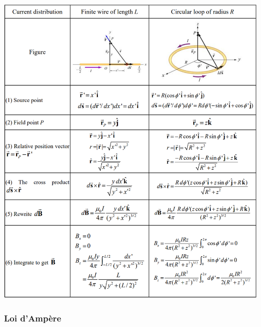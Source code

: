 \documentclass[a4paper]{article}
\begin{document}
\begin{center}
\includegraphics[width=\textwidth]{MagneticField.PNG}
\end{center}







\newpage







\subsubsection{Loi d'Ampère}
\end{document}
